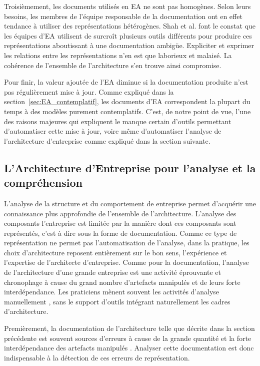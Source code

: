 Troisièmement, les documents utilisés en EA ne sont pas homogènes. Selon
leurs besoins, les membres de l'équipe responsable de la documentation ont en
effet tendance à utiliser des représentations hétérogènes. Shah et al.
\cite{shah2007frameworks} font le constat que les équipes d'EA utilisent de
surcroît plusieurs outils différents pour produire ces représentations
aboutissant à une documentation ambigüe. Expliciter et exprimer les relations
entre les représentations n'en est que laborieux et malaisé. La cohérence de
l'ensemble de l'architecture s'en trouve ainsi compromise.

 Pour finir, la valeur ajoutée de l'EA diminue si la documentation produite
n'est pas régulièrement mise à jour. Comme expliqué dans la
section~\ref{sec:EA_contemplatif}, les documents d'EA correspondent la plupart
du temps à des modèles purement contemplatifs. C'est, de notre point de vue,
l'une des raisons majeures qui expliquent le manque certain d'outils permettant
d'automatiser cette mise à jour, voire même d'automatiser l'analyse de
l'architecture d'entreprise comme expliqué dans la section suivante.


	\subsection{L'Architecture d'Entreprise pour l'analyse et la compréhension}
	\label{sec:EA_analyse_limite}

L'analyse de la structure et du comportement de entreprise permet d'acquérir
une connaissance plus approfondie de l'ensemble de l'architecture. L'analyse des
composants l'entreprise est limitée par la manière dont ces composants sont
représentés, c'est à dire sous la forme de documentation. Comme ce type de
représentation ne permet pas l'automatisation de l'analyse, dans la pratique,
les choix d'architecture reposent entièrement sur le bon sens, l'expérience et
l'expertise de l'architecte d'entreprise. Comme pour la documentation, l'analyse
de l'architecture d'une grande entreprise est une activité éprouvante et
chronophage à cause du grand nombre d'artefacts manipulés et de leurs forte
interdépendance. Les praticiens mènent souvent les activités d'analyse
manuellement \cite{barn2013enterprise}, sans le support d'outils intégrant
naturellement les cadres d'architecture.

Premièrement, la documentation de l'architecture telle que décrite dans la
section précédente est souvent sources d'erreurs à cause de la grande quantité
et la forte interdépendance des artefacts manipulés
\cite{kaisler_enterprise_2005}. Analyser cette documentation est donc
indispensable à la détection de ces erreurs de représentation.

